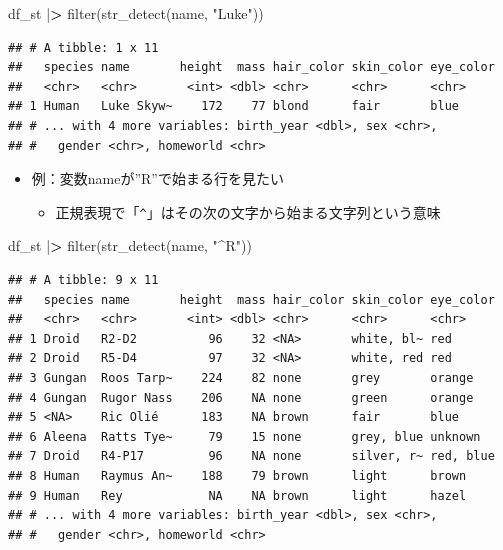 \documentclass[
  xelatex,ja=standard, b5paper]{bxjsbook}
\newenvironment{Shaded}{\begin{snugshade}}{\end{snugshade}}
\newcommand{\ErrorTok}[1]{\textcolor[rgb]{0.64,0.00,0.00}{\textbf{#1}}}
\newcommand{\FunctionTok}[1]{\textcolor[rgb]{0.00,0.00,0.00}{#1}}
\newcommand{\NormalTok}[1]{#1}
\newcommand{\SpecialCharTok}[1]{\textcolor[rgb]{0.00,0.00,0.00}{#1}}
\newcommand{\StringTok}[1]{\textcolor[rgb]{0.31,0.60,0.02}{#1}}
\providecommand{\tightlist}{%
  \setlength{\itemsep}{0pt}\setlength{\parskip}{0pt}}
\begin{document}
\begin{Shaded}
\begin{Highlighting}[]
\NormalTok{df\_st }\SpecialCharTok{|}\ErrorTok{\textgreater{}}
  \FunctionTok{filter}\NormalTok{(}\FunctionTok{str\_detect}\NormalTok{(name, }\StringTok{"Luke"}\NormalTok{))}
\end{Highlighting}
\end{Shaded}

\begin{verbatim}
## # A tibble: 1 x 11
##   species name       height  mass hair_color skin_color eye_color
##   <chr>   <chr>       <int> <dbl> <chr>      <chr>      <chr>    
## 1 Human   Luke Skyw~    172    77 blond      fair       blue     
## # ... with 4 more variables: birth_year <dbl>, sex <chr>,
## #   gender <chr>, homeworld <chr>
\end{verbatim}

\begin{itemize}
\tightlist
\item
  例：変数nameが''R''で始まる行を見たい

  \begin{itemize}
  \tightlist
  \item
    正規表現で「\texttt{\^{}}」はその次の文字から始まる文字列という意味
  \end{itemize}
\end{itemize}

\begin{Shaded}
\begin{Highlighting}[]
\NormalTok{df\_st }\SpecialCharTok{|}\ErrorTok{\textgreater{}}
  \FunctionTok{filter}\NormalTok{(}\FunctionTok{str\_detect}\NormalTok{(name, }\StringTok{"\^{}R"}\NormalTok{))}
\end{Highlighting}
\end{Shaded}

\begin{verbatim}
## # A tibble: 9 x 11
##   species name       height  mass hair_color skin_color eye_color
##   <chr>   <chr>       <int> <dbl> <chr>      <chr>      <chr>    
## 1 Droid   R2-D2          96    32 <NA>       white, bl~ red      
## 2 Droid   R5-D4          97    32 <NA>       white, red red      
## 3 Gungan  Roos Tarp~    224    82 none       grey       orange   
## 4 Gungan  Rugor Nass    206    NA none       green      orange   
## 5 <NA>    Ric Olié      183    NA brown      fair       blue     
## 6 Aleena  Ratts Tye~     79    15 none       grey, blue unknown  
## 7 Droid   R4-P17         96    NA none       silver, r~ red, blue
## 8 Human   Raymus An~    188    79 brown      light      brown    
## 9 Human   Rey            NA    NA brown      light      hazel    
## # ... with 4 more variables: birth_year <dbl>, sex <chr>,
## #   gender <chr>, homeworld <chr>
\end{verbatim}
\end{document}
